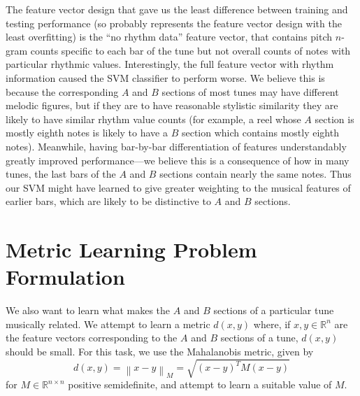 \documentclass{article} %
\newcommand{\vectornorm}[1]{\left\| #1 \right\|}
\begin{document}
The feature vector design that gave us the least difference between training and
testing performance (so probably represents the feature vector design with the
least overfitting) is the ``no rhythm data'' feature vector, that contains
pitch $n$-gram counts specific to each bar of the tune but not overall counts of
notes with particular rhythmic values. Interestingly, the full feature vector
with rhythm information caused the SVM classifier to perform worse. We believe
this is because the corresponding $A$ and $B$ sections of most tunes may have
different melodic figures, but if they are to have reasonable stylistic
similarity they are likely to have similar rhythm value counts (for example, a
reel whose $A$ section is mostly eighth notes is likely to have a $B$ section
which contains mostly eighth notes). Meanwhile, having bar-by-bar
differentiation of features understandably greatly improved performance---we
believe this is a consequence of how in many tunes, the last bars of the $A$ and
$B$ sections contain nearly the same notes. Thus our SVM might have learned to
give greater weighting to the musical features of earlier bars, which are likely
to be distinctive to $A$ and $B$ sections.


\section{Metric Learning Problem Formulation}
We also want to learn what makes the $A$ and $B$ sections of a particular tune
musically related. We attempt to learn a metric $d(x, y)$ where, if $x, y \in
\mathbb{R}^n$ are the feature vectors corresponding to the $A$ and $B$ sections
of a tune, $d(x, y)$ should be small. For this task, we use the Mahalanobis
metric, given by
\[
d(x,y) = \vectornorm{x-y}_M = \sqrt{(x-y)^T M (x-y)}
\] 
for $M \in \mathbb{R}^{n\times n}$ positive semidefinite, and attempt to learn a
suitable value of $M$.
\end{document}
